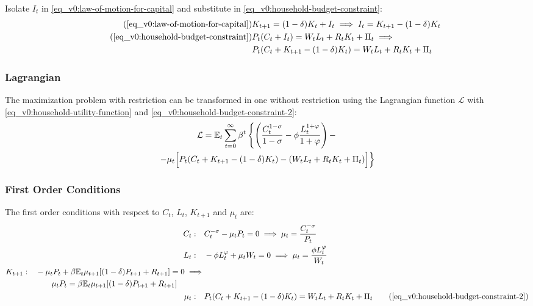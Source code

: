 \documentclass[
thesis.tex
]{subfiles}
\begin{document}
	Isolate $I_t$ in \ref{eq_v0:law-of-motion-for-capital} and substitute in \ref{eq_v0:household-budget-constraint}:
	\begin{align}
		\tag{\ref{eq_v0:law-of-motion-for-capital}}
		& K_{t+1} = (1-\delta)K_t + I_t \implies I_t = K_{t+1} - (1-\delta)K_t \\
		\tag{\ref{eq_v0:household-budget-constraint}}
		& P_t (C_t + I_t) = W_t L_t + R_t K_t + \Pi_t \implies \\
		\label{eq_v0:household-budget-constraint-2}
		& P_t (C_t + K_{t+1} - (1-\delta)K_t) = W_t L_t + R_t K_t + \Pi_t
	\end{align}
	
	\subsubsection*{Lagrangian}
	
	The maximization problem with restriction can be transformed in one without restriction using the Lagrangian function $\mathcal{L}$ with \ref{eq_v0:household-utility-function} and \ref{eq_v0:household-budget-constraint-2}:
	\begin{multline}
		\label{eq_v0:household-lagrangian}
		\mathcal{L} = \mathbb{E}_t \sum_{t=0}^{\infty} \beta^t 
		\left\{ \left( \frac{C_t^{1-\sigma}}{1-\sigma} - \phi \frac{L_t^{1+\varphi}}{1+\varphi} \right) - \right.
		\\
		\left. -\mu_t \Bigr[ P_t (C_t + K_{t+1} - (1-\delta) K_t) - (W_t L_t + R_t K_t + \Pi_t) \Bigl] \right\}
	\end{multline}
	
	\subsubsection*{First Order Conditions}
	
	The first order conditions with respect to $C_t$, $L_t$, $K_{t+1}$ and $\mu_t$ are:
	\begin{align}
		C_t: \quad & C_t^{-\sigma} -\mu_t P_t = 0 \implies \mu_t = \frac{C_t^{-\sigma}}{P_t} \label{eq_v0:household-FOC-Ct} \\
		L_t: \quad & -\phi L_t^{\varphi} +\mu_t W_t = 0 \implies \mu_t = \frac{\phi L_t^{\varphi}}{W_t} \label{eq_v0:household-FOC-Lt} \\
		\begin{split}
			K_{t+1}: \quad & -\mu_t P_t +\beta \mathbb{E}_t \mu_{t+1} [(1-\delta) P_{t+1} + R_{t+1}] = 0 \implies \\ & \qquad \mu_t P_t = \beta \mathbb{E}_t \mu_{t+1} [(1-\delta) P_{t+1} + R_{t+1}]
		\end{split} \label{eq_v0:household-FOC-Kt} \\
		\mu_t: \quad & P_t (C_t + K_{t+1} - (1-\delta)K_t) = W_t L_t + R_t K_t + \Pi_t \tag{\ref{eq_v0:household-budget-constraint-2}}
	\end{align}
	
\end{document}
